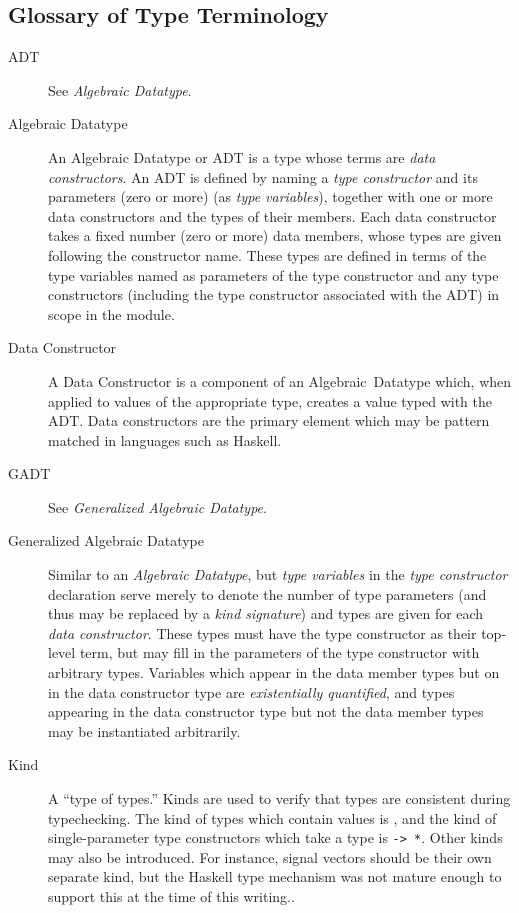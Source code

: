 \begin{code}
\section{Glossary of Type Terminology}
\label{section:Haskell_Concepts-Glossary_of_Type_Terminology}
\begin{description}
\item[ADT] See {\em Algebraic Datatype}.

\item[Algebraic Datatype] An Algebraic Datatype or ADT is a type whose terms
are {\em data constructors}. An ADT is defined by naming a
{\em type constructor} and its parameters (zero or more)
(as {\em type variables}), together with one or more data constructors and the
types of their members. Each data constructor takes a fixed number
(zero or more) data members, whose types are given following the constructor
name. These types are defined in terms of the type variables named as parameters
of the type constructor and any type constructors (including the type
constructor associated with the ADT) in scope in the module.

\item[Data Constructor] A Data Constructor is a component of an
Algebraic~Datatype which, when applied to values of the appropriate type, 
creates a value typed with the ADT. Data constructors are the primary element
which may be pattern matched in languages such as Haskell.

\item[GADT] See {\em Generalized Algebraic Datatype}.

\item[Generalized Algebraic Datatype] Similar to an {\em Algebraic Datatype},
but {\em type variables} in the {\em type constructor} declaration serve merely
to denote the number of type parameters (and thus may be replaced by a
{\em kind signature}) and types are given for each {\em data constructor}. These
types must have the type constructor as their top-level term, but may fill in
the parameters of the type constructor with arbitrary types. Variables which
appear in the data member types but on in the data constructor type are
{\em existentially quantified}, and types appearing in the data constructor
type but not the data member types may be instantiated arbitrarily.

\item[Kind] A ``type of types.'' Kinds are used to verify that types are
consistent during typechecking. The kind of types which contain values is
{\tt *}, and the kind of single-parameter type constructors which take a
type is {\tt * -> *}. Other kinds may also be introduced. For instance,
signal vectors should be their own separate kind, but the Haskell type mechanism
was not mature enough to support this at the time of this writing..


\end{description}
\end{code}
